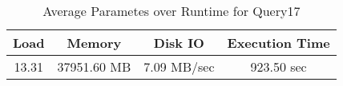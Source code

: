 \documentclass[../../main.tex]{subfiles}
\begin{document}
    \begin{table}
        \begin{center}
            \begin{tabular}{ |c|c|c|c| } 
            \hline
            Load & Memory & Disk IO & Execution Time\\
            \hline
            13.31 & 37951.60 MB & 7.09 MB/sec & 923.50 sec \\
            \hline
            \end{tabular}
            \\[1pt]
            \caption{Average Parametes over Runtime for Query17}
        \end{center}
    \end{table}
    \pagebreak
\end{document}
